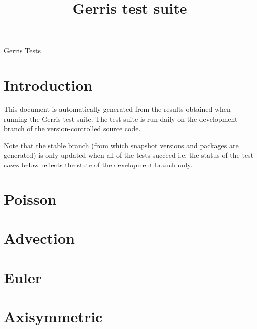 \documentclass[a4paper]{article}
\title{Gerris test suite}
\begin{document}
\mbox{}\vspace{1cm}
\begin{center}
{\Huge Gerris Tests}\\
\vspace{1cm}

\vspace{5mm}
\end{center}

\section{Introduction}

This document is automatically generated from the results obtained
when running the Gerris test suite. The test suite is run daily on the
development branch of the version-controlled source code. 

Note that the stable branch (from which snapshot versions and packages
are generated) is only updated when all of the tests succeed i.e. the
status of the test cases below reflects the state of the development
branch only.

\section{Poisson}









\section{Advection}





\section{Euler}






\section{Axisymmetric}




\end{document}
